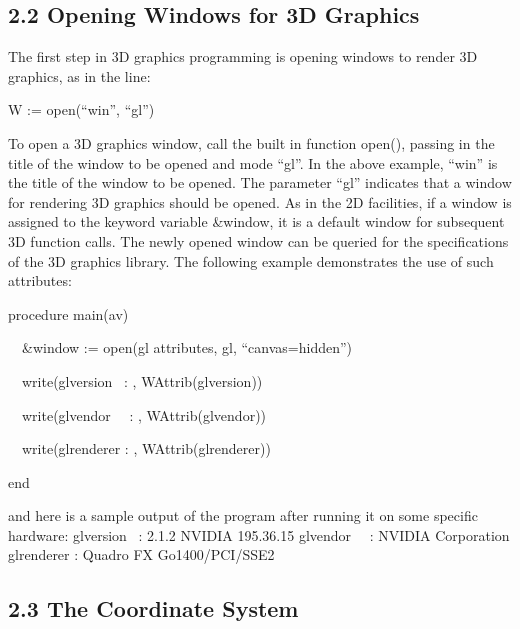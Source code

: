 \documentclass[letterpaper]{article}
\begin{document}
\subsection[2.2 Opening Windows for 3D Graphics]
{2.2 Opening Windows for 3D Graphics}


{
The first step in 3D graphics programming is opening windows to render 3D graphics, as in the line: }

{\sffamily
W := open(``win'', ``gl'')}


\bigskip

To open a 3D graphics window, call the built in function
\textsf{open()}, passing in the title of the window to be
opened and mode \textsf{``gl''}. In the above example,
\textsf{``win''} is the title of the window to be opened. The
parameter \textsf{``gl''} indicates that a window for rendering 3D
graphics should be opened. As in the 2D facilities, if a window is
assigned to the keyword variable \textsf{\&window}, it is a default
window for subsequent 3D function calls. The newly opened window can
be queried for the specifications of the 3D graphics library. The
following example demonstrates the use of such attributes:

\textsf{procedure main(av)}

\textsf{ \ \ \&window := open({\textquotedbl}gl attributes{\textquotedbl}, {\textquotedbl}gl{\textquotedbl},
``canvas=hidden'')}

\textsf{ \ \ write({\textquotedbl}glversion \ : {\textquotedbl},
 WAttrib({\textquotedbl}glversion{\textquotedbl}))}

\textsf{ \ \ write({\textquotedbl}glvendor \ \ : {\textquotedbl},
 WAttrib({\textquotedbl}glvendor{\textquotedbl}))}

\textsf{ \ \ write({\textquotedbl}glrenderer : {\textquotedbl},
 WAttrib({\textquotedbl}glrenderer{\textquotedbl}))}

\textsf{end}

\noindent
and here is a sample output of the program after running it on some specific hardware:\newline
\newline
\textsf{glversion \ : 2.1.2 NVIDIA 195.36.15\newline
glvendor \ \ : NVIDIA Corporation\newline
glrenderer : Quadro FX Go1400/PCI/SSE2}\newline


\subsection[2.3 The Coordinate System]{2.3 The Coordinate System}
\end{document}
